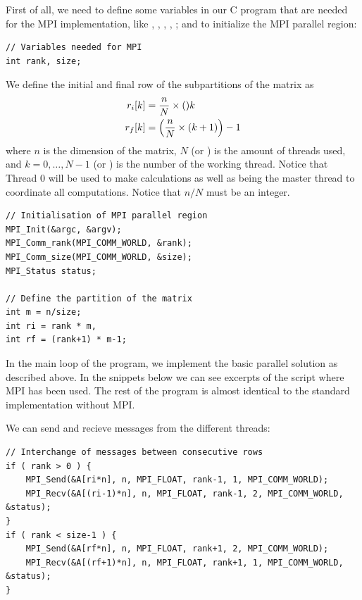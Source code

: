 First of all, we need to define some variables in our C program that are needed for the MPI implementation, like , , , , ; and to initialize the MPI parallel region:

\begin{lstlisting}[firstnumber=52]
 // Variables needed for MPI
int rank, size;
\end{lstlisting}

We define the initial and final row of the subpartitions of the matrix as
\begin{align}
\begin{aligned}
    r_{i}[k] &= \frac{n}{N} \times \qty k \\
    r_{f}[k] &= \qty( \frac{n}{N} \times (k + 1) ) - 1 \\
\end{aligned}        
\end{align}
where $n$ is the dimension of the matrix, $N$ (or ) is the amount of threads used, and $k = 0, \dots, N-1$ (or ) is the number of the working thread. Notice that Thread 0 will be used to make calculations as well as being the master thread to coordinate all computations. Notice that $n/N$ must be an integer.
 
\begin{lstlisting}[firstnumber=75]
// Initialisation of MPI parallel region
MPI_Init(&argc, &argv);
MPI_Comm_rank(MPI_COMM_WORLD, &rank);
MPI_Comm_size(MPI_COMM_WORLD, &size);
MPI_Status status;

// Define the partition of the matrix
int m = n/size;
int ri = rank * m, 
int rf = (rank+1) * m-1;
\end{lstlisting}

In the main loop of the program, we implement the basic parallel solution as described above. In the snippets below we can see excerpts of the script where MPI has been used. The rest of the program is almost identical to the standard implementation without MPI.

We can send and recieve messages from the different threads:
\begin{lstlisting}[firstnumber=96]
// Interchange of messages between consecutive rows
if ( rank > 0 ) {
	MPI_Send(&A[ri*n], n, MPI_FLOAT, rank-1, 1, MPI_COMM_WORLD);
	MPI_Recv(&A[(ri-1)*n], n, MPI_FLOAT, rank-1, 2, MPI_COMM_WORLD, &status);
}
if ( rank < size-1 ) {
	MPI_Send(&A[rf*n], n, MPI_FLOAT, rank+1, 2, MPI_COMM_WORLD);
	MPI_Recv(&A[(rf+1)*n], n, MPI_FLOAT, rank+1, 1, MPI_COMM_WORLD, &status);
}
\end{lstlisting}

